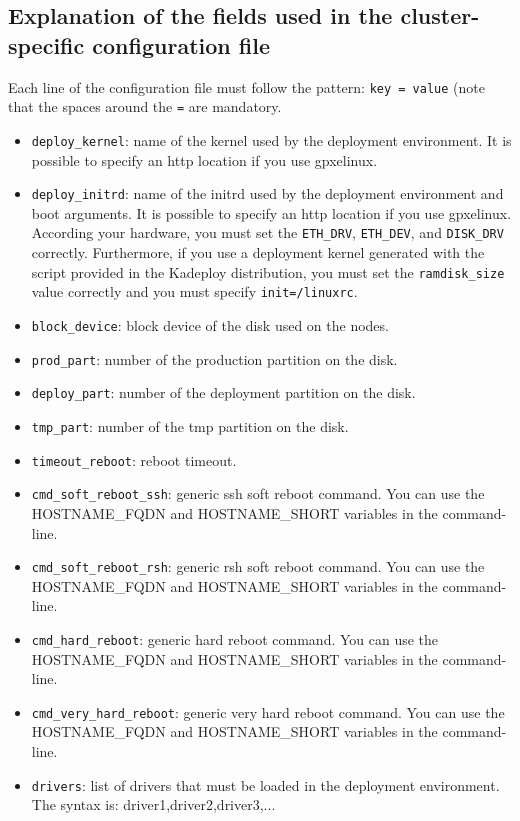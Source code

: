 \documentclass[a4wide,10pt,oneside]{book}
\begin{document}
\subsection{Explanation of the fields used in the cluster-specific configuration file}
Each line of the configuration file must follow the pattern: \texttt{key = value} (note that the spaces around the \texttt{=} are mandatory.
\begin{itemize}
\item \texttt{deploy\_kernel}: name of the kernel used by the deployment environment. It is possible to specify an http location if you use gpxelinux.
\item \texttt{deploy\_initrd}: name of the initrd used by the deployment environment and boot arguments. It is possible to specify an http location if you use gpxelinux. According your hardware, you must set the \texttt{ETH\_DRV}, \texttt{ETH\_DEV}, and \texttt{DISK\_DRV} correctly. Furthermore, if you use a deployment kernel generated with the script provided in the Kadeploy distribution, you must set the \texttt{ramdisk\_size} value correctly and you must specify \texttt{init=/linuxrc}.
\item \texttt{block\_device}: block device of the disk used on the nodes.
\item \texttt{prod\_part}: number of the production partition on the disk.
\item \texttt{deploy\_part}: number of the deployment partition on the disk.
\item \texttt{tmp\_part}: number of the tmp partition on the disk.
\item \texttt{timeout\_reboot}: reboot timeout.
\item \texttt{cmd\_soft\_reboot\_ssh}: generic ssh soft reboot command. You can use the HOSTNAME\_FQDN and HOSTNAME\_SHORT variables in the command-line.
\item \texttt{cmd\_soft\_reboot\_rsh}: generic rsh soft reboot command. You can use the HOSTNAME\_FQDN and HOSTNAME\_SHORT variables in the command-line.
\item \texttt{cmd\_hard\_reboot}: generic hard reboot command. You can use the HOSTNAME\_FQDN and HOSTNAME\_SHORT variables in the command-line.
\item \texttt{cmd\_very\_hard\_reboot}: generic very hard reboot command. You can use the HOSTNAME\_FQDN and HOSTNAME\_SHORT variables in the command-line.
\item \texttt{drivers}: list of drivers that must be loaded in the deployment environment. The syntax is: driver1,driver2,driver3,...

\end{itemize}
\end{document}
